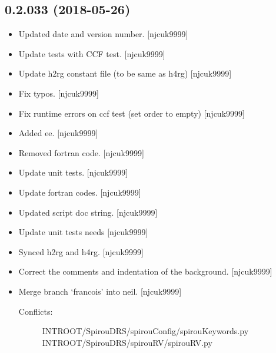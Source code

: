 \documentclass[a4paper,10pt,english]{report}
\begin{document}
\subsection{0.2.033 (2018-05-26)}
\label{\detokenize{misc/changelog:id429}}\begin{itemize}
\item {} 
Updated date and version number. {[}njcuk9999{]}

\item {} 
Update tests with CCF test. {[}njcuk9999{]}

\item {} 
Update h2rg constant file (to be same as h4rg) {[}njcuk9999{]}

\item {} 
Fix typos. {[}njcuk9999{]}

\item {} 
Fix runtime errors on ccf test (set order to empty) {[}njcuk9999{]}

\item {} 
Added ee. {[}njcuk9999{]}

\item {} 
Removed fortran code. {[}njcuk9999{]}

\item {} 
Update unit tests. {[}njcuk9999{]}

\item {} 
Update fortran codes. {[}njcuk9999{]}

\item {} 
Updated script doc string. {[}njcuk9999{]}

\item {} 
Update unit tests  needs  {[}njcuk9999{]}

\item {} 
Synced h2rg and h4rg. {[}njcuk9999{]}

\item {} 
Correct the comments and indentation of the background. {[}njcuk9999{]}

\item {} 
Merge branch ‘francois’ into neil. {[}njcuk9999{]}
\begin{description}
\item[{Conflicts:}] \leavevmode
INTROOT/SpirouDRS/spirouConfig/spirouKeywords.py
INTROOT/SpirouDRS/spirouRV/spirouRV.py


\end{description}
\end{itemize}
\end{document}
